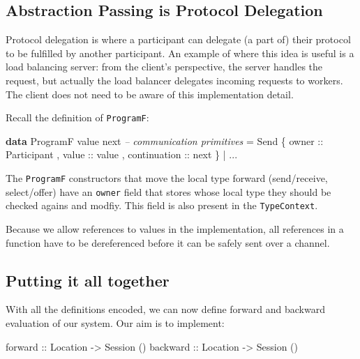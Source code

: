\documentclass[runningheads,plain]{llncs}
\newenvironment{Shaded}{}{}
\newcommand{\KeywordTok}[1]{\textcolor[rgb]{0.00,0.44,0.13}{\textbf{#1}}}
\newcommand{\DataTypeTok}[1]{\textcolor[rgb]{0.56,0.13,0.00}{#1}}
\newcommand{\CommentTok}[1]{\textcolor[rgb]{0.38,0.63,0.69}{\textit{#1}}}
\newcommand{\OtherTok}[1]{\textcolor[rgb]{0.00,0.44,0.13}{#1}}
\newcommand{\FunctionTok}[1]{\textcolor[rgb]{0.02,0.16,0.49}{#1}}
\newcommand{\NormalTok}[1]{#1}
\begin{document}
\subsection{Abstraction Passing is Protocol
Delegation}\label{abstraction-passing}

Protocol delegation is where a participant can delegate (a part of)
their protocol to be fulfilled by another participant. An example of
where this idea is useful is a load balancing server: from the client's
perspective, the server handles the request, but actually the load
balancer delegates incoming requests to workers. The client does not
need to be aware of this implementation detail.

Recall the definition of \texttt{ProgramF}:

\begin{Shaded}
\begin{Highlighting}[]
\KeywordTok{data} \DataTypeTok{ProgramF}\NormalTok{ value next }
    \CommentTok{-- communication primitives}
    \FunctionTok{=} \DataTypeTok{Send} 
\NormalTok{        \{}\OtherTok{ owner ::} \DataTypeTok{Participant}
\NormalTok{        ,}\OtherTok{ value ::}\NormalTok{ value}
\NormalTok{        ,}\OtherTok{ continuation ::}\NormalTok{ next }
\NormalTok{        \}}
    \FunctionTok{|} \FunctionTok{...} 
\end{Highlighting}
\end{Shaded}

The \texttt{ProgramF} constructors that move the local type forward
(send/receive, select/offer) have an \texttt{owner} field that stores
whose local type they should be checked agains and modfiy. This field is
also present in the \texttt{TypeContext}.

Because we allow references to values in the implementation, all
references in a function have to be dereferenced before it can be safely
sent over a channel.


\subsection{Putting it all together}\label{combining}

With all the definitions encoded, we can now define forward and backward
evaluation of our system. Our aim is to implement:

\begin{Shaded}
\begin{Highlighting}[]
\OtherTok{forward  ::} \DataTypeTok{Location} \OtherTok{->} \DataTypeTok{Session}\NormalTok{ ()}
\OtherTok{backward ::} \DataTypeTok{Location} \OtherTok{->} \DataTypeTok{Session}\NormalTok{ ()}
\end{Highlighting}
\end{Shaded}
\end{document}
